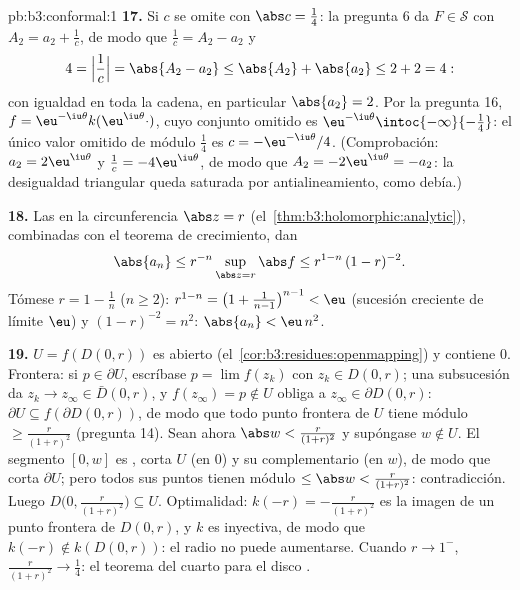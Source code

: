 \begin{solution}{pb:b3:conformal:1}
\textbf{17.} Si $c$ se omite con $\abs c = \frac14$: la pregunta 6 da
$F \in \mathcal S$ con $A_2 = a_2 +
\frac1c$, de modo que $\frac1c = A_2 - a_2$ y
\[
4 = \Bigl|\frac1c\Bigr| = \abs{A_2 - a_2}
\leq \abs{A_2} + \abs{a_2} \leq 2 + 2 = 4 :
\]
con igualdad en toda la cadena, en particular $\abs{a_2} = 2$. Por la
pregunta 16, $f = \eu^{-\iu\theta}k(\eu^{\iu\theta}\cdot)$, cuyo
conjunto omitido es $\eu^{-\iu\theta}
\intoc{-\infty}{-\frac14}$: el único valor omitido de módulo $\frac14$
es $c = -\eu^{-\iu\theta}/4$. (Comprobación: $a_2 = 2\eu^{\iu\theta}$ y
$\frac1c = -4\eu^{\iu\theta}$, de modo que
$A_2 = -2\eu^{\iu\theta} = -a_2$: la desigualdad triangular queda
saturada por antialineamiento, como debía.)

\textbf{18.} Las  en la circunferencia $\abs z =
r$ (el~\cref{thm:b3:holomorphic:analytic}), combinadas con el teorema de
crecimiento, dan \[
\abs{a_n} \leq r^{-n}\sup_{\abs z = r}\abs f
\leq r^{1-n}\,(1 - r)^{-2} .
\] Tómese $r = 1 - \frac1n$ ($n \geq
2$): $r^{1-n} = \bigl(1 + \frac1{n-1}\bigr)^{n-1} < \eu$ (sucesión
creciente de límite $\eu$) y $(1 - r)^{-2} =
n^2$: $\abs{a_n} < \eu\,n^2$.

\textbf{19.} $U = f(D(0, r))$ es abierto
(el~\cref{cor:b3:residues:openmapping}) y contiene $0$. Frontera: si
$p \in \partial U$, escríbase $p = \lim f(z_k)$ con $z_k \in D(0, r)$;
una subsucesión da $z_k \to z_\infty
\in \bar D(0, r)$, y $f(z_\infty) = p \notin U$ obliga a
$z_\infty \in \partial D(0, r)$: $\partial U \subseteq
f(\partial D(0, r))$, de modo que todo punto frontera de $U$ tiene
módulo $\geq \frac r{(1+r)^2}$ (pregunta 14). Sean ahora
$\abs w < \frac r{(1+r)^2}$ y supóngase $w \notin U$. El segmento
$[0, w]$ es , corta $U$ (en
$0$) y su complementario (en $w$), de modo que corta $\partial U$; pero
todos sus puntos tienen módulo $\leq \abs w < \frac r{(1+r)^2}$:
contradicción. Luego $D\bigl(0, \frac r{(1+r)^2}\bigr)
\subseteq U$. Optimalidad: $k(-r) = -\frac r{(1+r)^2}$ es la imagen de
un punto frontera de $D(0,r)$, y $k$ es inyectiva, de modo que
$k(-r) \notin k(D(0, r))$: el radio no puede aumentarse. Cuando
$r \to 1^-$, $\frac r{(1+r)^2} \to \frac14$: el teorema del cuarto para
el disco .


\end{solution}
